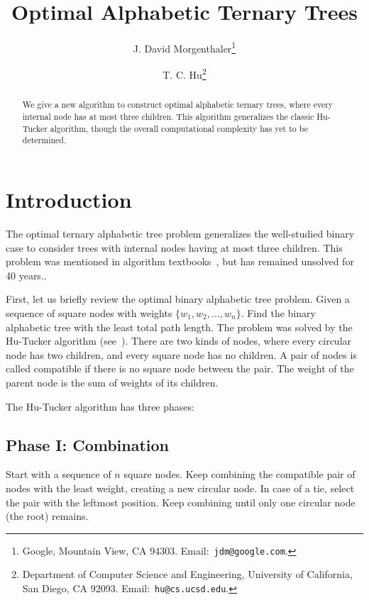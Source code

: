 \documentclass[12pt]{article}
\begin{document}
\title{Optimal Alphabetic Ternary Trees}
\author{ J. David Morgenthaler\thanks{Google, Mountain View, CA 94303. 
	 Email:~{\tt jdm@google.com}. } 
\and 	 
	 T. C. Hu\thanks{Department of Computer Science and Engineering,
	 University of California, San Diego, CA 92093. 
	 Email:~{\tt hu@cs.ucsd.edu}. }
}
\maketitle

\begin{abstract}
We give a new algorithm to construct optimal alphabetic ternary trees, where
every internal node has at most three children. This algorithm generalizes the
classic Hu-Tucker algorithm, though the overall computational complexity has yet
to be determined.

\end{abstract}

\section{Introduction}

The optimal ternary alphabetic tree problem generalizes the well-studied binary
case to consider trees with internal nodes having at most three children. This
problem was mentioned in algorithm textbooks~\cite{hu02, knuth73}, but has
remained unsolved for 40 years..

First, let us briefly review the optimal binary alphabetic tree problem.
Given a sequence of square nodes with weights $\{w_1, w_2,\ldots, w_n\}$.
Find the binary alphabetic tree with the least total path length.
The problem was solved by the Hu-Tucker algorithm (see~\cite{hu02, hu71}).
There are two kinds of nodes, where every circular node has two children,
and every square node has no children.  A pair of nodes is called compatible
if there is no square node between the pair. The weight of the parent node
is the sum of weights of its children.

The Hu-Tucker algorithm has three phases:
 
\subsection*{Phase I: Combination}

Start with a sequence of $n$ square nodes. Keep combining the compatible pair
of nodes with the least weight, creating a new circular node.  In case of a tie,
select the pair with the leftmost position. Keep combining until only one
circular node (the root) remains.
\end{document}
